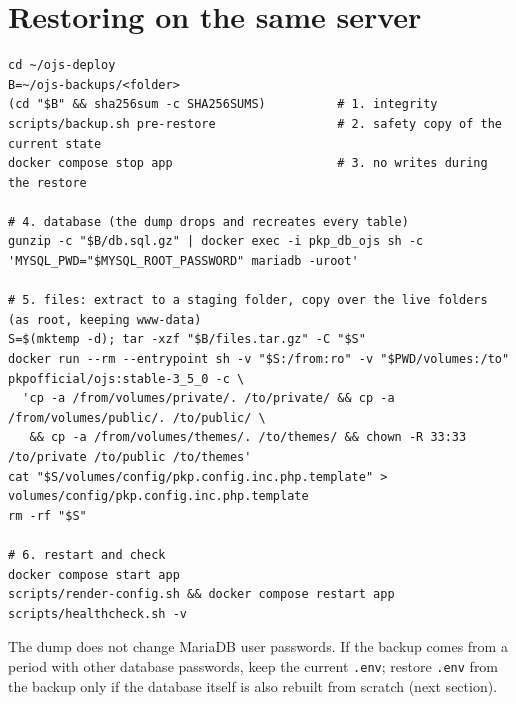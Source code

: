 \documentclass[11pt,a4paper]{report}
\newcommand{\file}[1]{\texttt{\small #1}}
\begin{document}
\section{Restoring on the same server}\label{sec:restore}
\begin{lstlisting}
cd ~/ojs-deploy
B=~/ojs-backups/<folder>
(cd "$B" && sha256sum -c SHA256SUMS)          # 1. integrity
scripts/backup.sh pre-restore                 # 2. safety copy of the current state
docker compose stop app                       # 3. no writes during the restore

# 4. database (the dump drops and recreates every table)
gunzip -c "$B/db.sql.gz" | docker exec -i pkp_db_ojs sh -c 'MYSQL_PWD="$MYSQL_ROOT_PASSWORD" mariadb -uroot'

# 5. files: extract to a staging folder, copy over the live folders (as root, keeping www-data)
S=$(mktemp -d); tar -xzf "$B/files.tar.gz" -C "$S"
docker run --rm --entrypoint sh -v "$S:/from:ro" -v "$PWD/volumes:/to" pkpofficial/ojs:stable-3_5_0 -c \
  'cp -a /from/volumes/private/. /to/private/ && cp -a /from/volumes/public/. /to/public/ \
   && cp -a /from/volumes/themes/. /to/themes/ && chown -R 33:33 /to/private /to/public /to/themes'
cat "$S/volumes/config/pkp.config.inc.php.template" > volumes/config/pkp.config.inc.php.template
rm -rf "$S"

# 6. restart and check
docker compose start app
scripts/render-config.sh && docker compose restart app
scripts/healthcheck.sh -v
\end{lstlisting}
\begin{note}
The dump does not change MariaDB user passwords. If the backup comes from a period with other
database passwords, keep the current \file{.env}; restore \file{.env} from the backup only if the
database itself is also rebuilt from scratch (next section).
\end{note}
\end{document}
